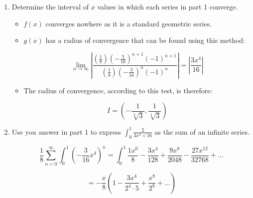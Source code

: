 \documentclass[11pt]{article}
\begin{document}
\begin{enumerate}
\begin{itemize}
	\end{itemize}
	
	\item Determine the interval of $x$ values in which each series in part 1 converge.
	
	\begin{itemize}
	
		\item $f(x)$ converges nowhere as it is a standard geometric series.
		
		\item $g(x)$ has a radius of convergence that can be found using this method:
		
		\begin{equation*}
		\lim_{n \to \infty}\left| 
		\frac{\left(\frac{1}{8}\right)
		\left(-\frac{3}{16}\right)^{n + 1} 
		(-1)^{n+1}}
		{\left(\frac{1}{8}\right)
		\left(-\frac{3}{16}\right)^{n} 
		(-1)^{n}}
		\right| = 
		\left|\frac{3x^4}{16}\right|
		\end{equation*}
		
		\item The radius of convergence, according to this test, is therefore:
		
		\begin{equation*}
			I = \left(-\frac{1}{\sqrt[4]{3}}, \frac{1}{\sqrt[4]{3}}\right)
		\end{equation*}
	\end{itemize}
	
	\item Use you answer in part 1 to express $\int_0^1 \frac{2}{3x^4 + 16}$ as the sum of an infinite series.
	
	\begin{equation*}
	\frac{1}{8}\sum_{n = 0}^{\infty}\int_0^1\left(-\frac{3}{16}x^4 \right)^n = 
	\int_0^1 \frac{1x^0}{8} - \frac{3x^4}{128} + \frac{9x^8}{2048} - \frac{27x^{12}}{32768} + ... 
	\end{equation*}
	
	
	\begin{equation*}
	= -\frac{x}{8}\left(1 - \frac{3 x^4}{2^4 \cdot 5} + \frac{x^8}{2^8} + ... \right)
	\end{equation*}
\end{enumerate}
\end{document}

